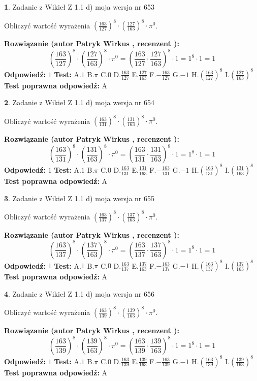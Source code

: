\documentclass[12pt, a4paper]{article}
\theoremstyle{definition} %
\newtheorem{zad}{}
\newcommand{\zadStart}[1]{\begin{zad}#1\newline}
\newcommand{\zadStop}{\end{zad}}
\newcommand{\rozwStart}[2]{\noindent \textbf{Rozwiązanie (autor #1 , recenzent #2): }\newline}
\newcommand{\rozwStop}{\newline}
\newcommand{\odpStart}{\noindent \textbf{Odpowiedź:}\newline}
\newcommand{\odpStop}{\newline}
\newcommand{\testStart}{\noindent \textbf{Test:}\newline}
\newcommand{\testStop}{\newline}
\newcommand{\kluczStart}{\noindent \textbf{Test poprawna odpowiedź:}\newline}
\newcommand{\kluczStop}{\newline}
\begin{document}
\zadStart{Zadanie z Wikieł Z 1.1 d) moja wersja nr 653}

Obliczyć wartość wyrażenia $(\frac{163}{127})^{8} \cdot (\frac{127}{163})^{8} \cdot \pi^{0}$.
\zadStop
\rozwStart{Patryk Wirkus}{}
$$(\frac{163}{127})^{8} \cdot (\frac{127}{163})^{8} \cdot \pi^{0} = (\frac{163}{127} \cdot \frac{127}{163})^{8} \cdot 1 = 1^{8} \cdot 1 = 1$$
\rozwStop
\odpStart
$1$
\odpStop
\testStart
A.$1$ B.$\pi$ C.$0$ D.$\frac{163}{127}$ E.$\frac{127}{163}$
F.$-\frac{163}{127}$ G.$-1$
H.$(\frac{163}{127})^{8}$
I.$(\frac{127}{163})^{8}$
\testStop
\kluczStart
A
\kluczStop



\zadStart{Zadanie z Wikieł Z 1.1 d) moja wersja nr 654}

Obliczyć wartość wyrażenia $(\frac{163}{131})^{8} \cdot (\frac{131}{163})^{8} \cdot \pi^{0}$.
\zadStop
\rozwStart{Patryk Wirkus}{}
$$(\frac{163}{131})^{8} \cdot (\frac{131}{163})^{8} \cdot \pi^{0} = (\frac{163}{131} \cdot \frac{131}{163})^{8} \cdot 1 = 1^{8} \cdot 1 = 1$$
\rozwStop
\odpStart
$1$
\odpStop
\testStart
A.$1$ B.$\pi$ C.$0$ D.$\frac{163}{131}$ E.$\frac{131}{163}$
F.$-\frac{163}{131}$ G.$-1$
H.$(\frac{163}{131})^{8}$
I.$(\frac{131}{163})^{8}$
\testStop
\kluczStart
A
\kluczStop



\zadStart{Zadanie z Wikieł Z 1.1 d) moja wersja nr 655}

Obliczyć wartość wyrażenia $(\frac{163}{137})^{8} \cdot (\frac{137}{163})^{8} \cdot \pi^{0}$.
\zadStop
\rozwStart{Patryk Wirkus}{}
$$(\frac{163}{137})^{8} \cdot (\frac{137}{163})^{8} \cdot \pi^{0} = (\frac{163}{137} \cdot \frac{137}{163})^{8} \cdot 1 = 1^{8} \cdot 1 = 1$$
\rozwStop
\odpStart
$1$
\odpStop
\testStart
A.$1$ B.$\pi$ C.$0$ D.$\frac{163}{137}$ E.$\frac{137}{163}$
F.$-\frac{163}{137}$ G.$-1$
H.$(\frac{163}{137})^{8}$
I.$(\frac{137}{163})^{8}$
\testStop
\kluczStart
A
\kluczStop



\zadStart{Zadanie z Wikieł Z 1.1 d) moja wersja nr 656}

Obliczyć wartość wyrażenia $(\frac{163}{139})^{8} \cdot (\frac{139}{163})^{8} \cdot \pi^{0}$.
\zadStop
\rozwStart{Patryk Wirkus}{}
$$(\frac{163}{139})^{8} \cdot (\frac{139}{163})^{8} \cdot \pi^{0} = (\frac{163}{139} \cdot \frac{139}{163})^{8} \cdot 1 = 1^{8} \cdot 1 = 1$$
\rozwStop
\odpStart
$1$
\odpStop
\testStart
A.$1$ B.$\pi$ C.$0$ D.$\frac{163}{139}$ E.$\frac{139}{163}$
F.$-\frac{163}{139}$ G.$-1$
H.$(\frac{163}{139})^{8}$
I.$(\frac{139}{163})^{8}$
\testStop
\kluczStart
A
\kluczStop
\end{document}
